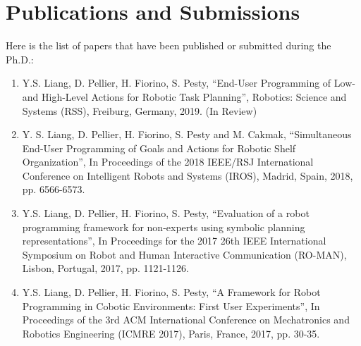 \chapter{Publications and Submissions}\label{app:publications}
Here is the list of papers that have been published or submitted during the Ph.D.:

\begin{enumerate}
	\item Y.S. Liang, D. Pellier, H. Fiorino, S. Pesty, “End-User Programming of Low- and High-Level Actions for Robotic Task Planning”, Robotics: Science and Systems (RSS), Freiburg, Germany, 2019. (In Review)
	
	\item Y. S. Liang, D. Pellier, H. Fiorino, S. Pesty and M. Cakmak, “Simultaneous End-User Programming of Goals and Actions for Robotic Shelf Organization”, In Proceedings of the 2018 IEEE/RSJ International Conference on Intelligent Robots and Systems (IROS), Madrid, Spain, 2018, pp. 6566-6573.
	
	\item Y.S. Liang, D. Pellier, H. Fiorino, S. Pesty, “Evaluation of a robot programming framework for non-experts using symbolic planning representations”, In Proceedings for the 2017 26th IEEE International Symposium on Robot and Human Interactive Communication (RO-MAN), Lisbon, Portugal, 2017, pp. 1121-1126.
	
	\item Y.S. Liang, D. Pellier, H. Fiorino, S. Pesty, “A Framework for Robot Programming in Cobotic Environments: First User Experiments”, In Proceedings of the 3rd ACM International Conference on Mechatronics and Robotics Engineering (ICMRE 2017), Paris, France, 2017, pp. 30-35.
	
\end{enumerate}


